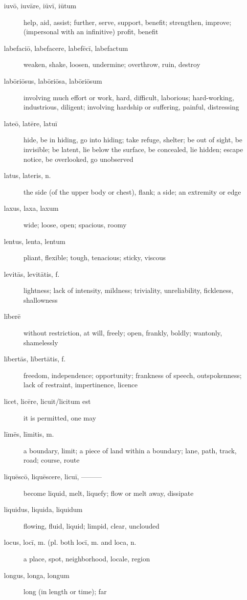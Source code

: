 \begin{description}
    \item[iuvō, iuvāre, iūvī, iūtum] \marginnote{*}help, aid, assist; further, serve, support, benefit; strengthen, improve; (impersonal with an infinitive) profit, benefit
    \item[labefaciō, labefacere, labefēcī, labefactum] weaken, shake, loosen, undermine; overthrow, ruin, destroy
    \item[labōriōsus, labōriōsa, labōriōsum] involving much effort or work, hard, difficult, laborious; hard-working, industrious, diligent; involving hardship or suffering, painful, distressing
    \item[lateō, latēre, latuī] \marginnote{*}hide, be in hiding, go into hiding; take refuge, shelter; be out of sight, be invisible; be latent, lie below the surface, be concealed, lie hidden; escape notice, be overlooked, go unobserved
    \item[latus, lateris, n.] \marginnote{*}the side (of the upper body or chest), flank; a side; an extremity or edge
    \item[laxus, laxa, laxum] wide; loose, open; spacious, roomy
    \item[lentus, lenta, lentum] pliant, flexible; tough, tenacious; sticky, viscous
    \item[levitās, levitātis, f.] lightness; lack of intensity, mildness; triviality, unreliability, fickleness, shallowness
    \item[līberē] without restriction, at will, freely; open, frankly, boldly; wantonly, shamelessly
    \item[lībertās, lībertātis, f.] \marginnote{*}freedom, independence; opportunity; frankness of speech, outspokenness; lack of restraint, impertinence, licence
    \item[licet, licēre, licuit/licitum est] \marginnote{*}it is permitted, one may
    \item[līmēs, līmitis, m.] a boundary, limit; a piece of land within a boundary; lane, path, track, road; course, route
    \item[liquēscō, liquēscere, licuī, ———] become liquid, melt, liquefy; flow or melt away, dissipate
    \item[liquidus, liquida, liquidum] flowing, fluid, liquid; limpid, clear, unclouded
    \item[locus, locī, m. (pl. both locī, m. and loca, n.] \marginnote{*}a place, spot, neighborhood, locale, region
    \item[longus, longa, longum] \marginnote{*}long (in length or time); far

\end{description}
